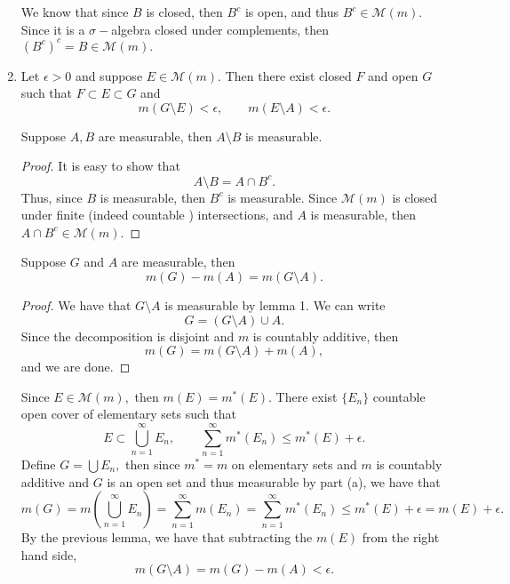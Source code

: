\documentclass[11pt]{article}
\newcommand{\sm}{\setminus}
\begin{document}
\begin{problem}
\begin{enumerate}
\begin{solution}
            We know that since $B$ is closed, then $B^c$ is open, and thus $B^c \in \mathcal{M}(m).$ Since it is a $\sigma-$algebra closed under complements, then $(B^c)^c = B \in \mathcal{M}(m).$
        \end{solution}
        \item Let $\epsilon>0$ and suppose $E \in \mathcal{M}(m).$ Then there exist closed $F$ and open $G$ such that $F \subset E \subset G$ and
        \[m(G\setminus E) < \epsilon, \qquad m(E \sm A)< \epsilon.\]
    \begin{solution}
        \begin{lemma}
            Suppose $A, B$ are measurable, then $A \setminus B$ is measurable. 
        \end{lemma}
        \begin{proof}
            It is easy to show that 
            \[A \setminus B = A \cap B^c.\] Thus, since $B$ is measurable, then $B^c$ is measurable. Since $\mathcal{M}(m)$ is closed under finite (indeed countable ) intersections, and $A$ is measurable, then $A \cap B^c \in \mathcal{M}(m).$ 
        \end{proof}
    \begin{lemma}
        Suppose $G$ and $A$ are measurable, then 
        \[m(G) - m(A) = m(G\setminus A).\]
    \end{lemma}
    \begin{proof}
        We have that $G\setminus A$ is measurable by lemma 1. We can write
        \[G = (G\setminus A) \cup A.\] Since the decomposition is disjoint and $m$ is countably additive, then 
        \[m(G) = m(G\setminus A) + m(A),\] and we are done.
    \end{proof}
        Since $E \in \mathcal{M}(m),$ then $m(E) = m^*(E).$ There exist $\{E_n\}$ countable open cover of elementary sets such that 
        \[E \subset \bigcup_{n=1}^\infty E_n, \qquad \sum_{n=1}^\infty m^*(E_n) \leq m^*(E) + \epsilon.\] Define $G = \bigcup E_n,$ then since $m^* = m$ on elementary sets and $m$ is countably additive and $G$ is an open set and thus measurable by part (a), we have that
        \[m(G) = m(\bigcup_{n=1}^\infty E_n) = \sum_{n=1}^\infty m(E_n) = \sum_{n=1}^\infty m^*(E_n) \leq m^*(E) + \epsilon = m(E) + \epsilon.\] By the previous lemma, we have that subtracting the $m(E)$ from the right hand side,
        \[m(G \setminus A) = m(G) - m(A) < \epsilon.\]


\end{solution}
\end{enumerate}
\end{problem}
\end{document}
